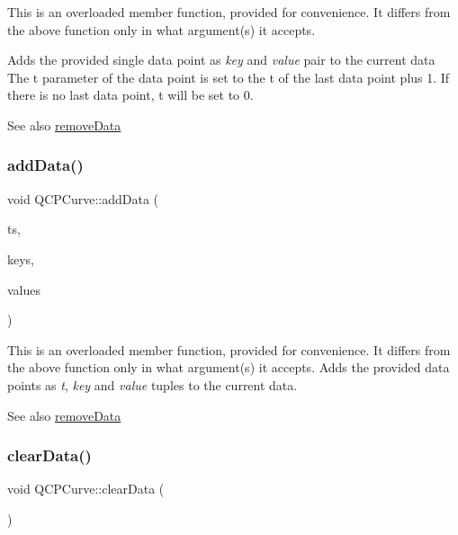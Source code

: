 This is an overloaded member function, provided for convenience. It differs from the above function only in what argument(s) it accepts.

Adds the provided single data point as {\itshape key} and {\itshape value} pair to the current data The t parameter of the data point is set to the t of the last data point plus 1. If there is no last data point, t will be set to 0.

\begin{DoxySeeAlso}{See also}
\mbox{\hyperlink{class_q_c_p_curve_ad45bb5479be799163028ef2b776f7221}{remove\+Data}} 
\end{DoxySeeAlso}
\mbox{\label{class_q_c_p_curve_a27c8b3dddd4067d626397ee199626722}} 
\subsubsection{\texorpdfstring{add\+Data()}{addData()}\hspace{0.1cm}{\footnotesize\ttfamily [5/5]}}
{\footnotesize\ttfamily void Q\+C\+P\+Curve\+::add\+Data (\begin{DoxyParamCaption}\item[{const Q\+Vector$<$ double $>$ \&}]{ts,  }\item[{const Q\+Vector$<$ double $>$ \&}]{keys,  }\item[{const Q\+Vector$<$ double $>$ \&}]{values }\end{DoxyParamCaption})}

This is an overloaded member function, provided for convenience. It differs from the above function only in what argument(s) it accepts. Adds the provided data points as {\itshape t}, {\itshape key} and {\itshape value} tuples to the current data. \begin{DoxySeeAlso}{See also}
\mbox{\hyperlink{class_q_c_p_curve_ad45bb5479be799163028ef2b776f7221}{remove\+Data}} 
\end{DoxySeeAlso}
\mbox{\label{class_q_c_p_curve_ae0462c61dbfbac07db0736ec64110241}} 
\subsubsection{\texorpdfstring{clear\+Data()}{clearData()}}
{\footnotesize\ttfamily void Q\+C\+P\+Curve\+::clear\+Data (\begin{DoxyParamCaption}{ }\end{DoxyParamCaption})\hspace{0.3cm}{\ttfamily [virtual]}}

